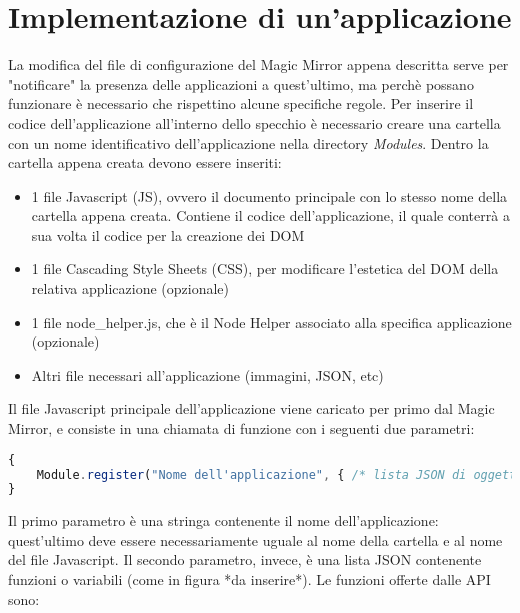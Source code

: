 \section{Implementazione di un'applicazione}
La modifica del file di configurazione del Magic Mirror appena descritta serve per "notificare" la presenza delle applicazioni a quest'ultimo,
ma perch\`e possano funzionare \`e necessario che rispettino alcune specifiche regole.
Per inserire il codice dell'applicazione all'interno dello specchio \`e necessario creare una cartella con un nome identificativo dell'applicazione
nella directory \textit{Modules}.
Dentro la cartella appena creata devono essere inseriti:
\begin{itemize}
\item 1 file Javascript (JS), ovvero il documento principale con lo stesso nome della cartella appena creata. Contiene il codice dell'applicazione, il quale
conterr\`a a sua volta il codice per la creazione dei DOM
\item 1 file Cascading Style Sheets (CSS), per modificare l'estetica del DOM della relativa applicazione (opzionale)
\item 1 file node\_helper.js, che \`e il Node Helper associato alla specifica applicazione (opzionale)
\item Altri file necessari all'applicazione (immagini, JSON, etc)\\[1\baselineskip]
\end{itemize}
Il file Javascript principale dell'applicazione viene caricato per primo dal Magic Mirror, e consiste in una chiamata di funzione con i seguenti due parametri:
\begin{lstlisting}[language=JavaScript]
{
	Module.register("Nome dell'applicazione", { /* lista JSON di oggetti contenenti funzioni o variabili */});
}
\end{lstlisting}
Il primo parametro \`e una stringa contenente il nome dell'applicazione: quest'ultimo deve essere necessariamente uguale al nome della cartella e al nome
del file Javascript. Il secondo parametro, invece, \`e una lista JSON contenente funzioni o variabili (come in figura *da inserire*).
Le funzioni offerte dalle API sono:

